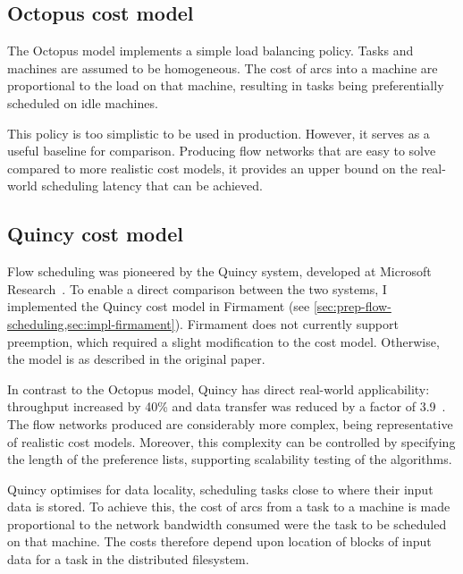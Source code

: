 \subsection{Octopus cost model} \label{sec:eval-benchmark-strategy-octopus}

The Octopus model implements a simple load balancing policy. Tasks and machines are assumed to be homogeneous. The cost of arcs into a machine are proportional to the load on that machine, resulting in tasks being preferentially scheduled on idle machines. 

This policy is too simplistic to be used in production. However, it serves as a useful baseline for comparison. Producing flow networks that are easy to solve compared to more realistic cost models, it provides an upper bound on the real-world scheduling latency that can be achieved.

\subsection{Quincy cost model} \label{sec:eval-benchmark-strategy-quincy}

Flow scheduling was pioneered by the Quincy system, developed at Microsoft Research~\cite{Isard:2009}. To enable a direct comparison between the two systems, I implemented the Quincy cost model in Firmament (see \cref{sec:prep-flow-scheduling,sec:impl-firmament}). Firmament does not currently support preemption, which required a slight modification to the cost model\footnotemark. Otherwise, the model is as described in the original paper.

In contrast to the Octopus model, Quincy has direct real-world applicability: throughput increased by 40\% and data transfer was reduced by a factor of 3.9~\cite{Isard:2009}. The flow networks produced are considerably more complex, being representative of realistic cost models. Moreover, this complexity can be controlled by specifying the length of the preference lists, supporting scalability testing of the algorithms.

Quincy optimises for data locality, scheduling tasks close to where their input data is stored. To achieve this, the cost of arcs from a task to a machine is made proportional to the network bandwidth consumed were the task to be scheduled on that machine. The costs therefore depend upon location of blocks of input data for a task in the distributed filesystem.

